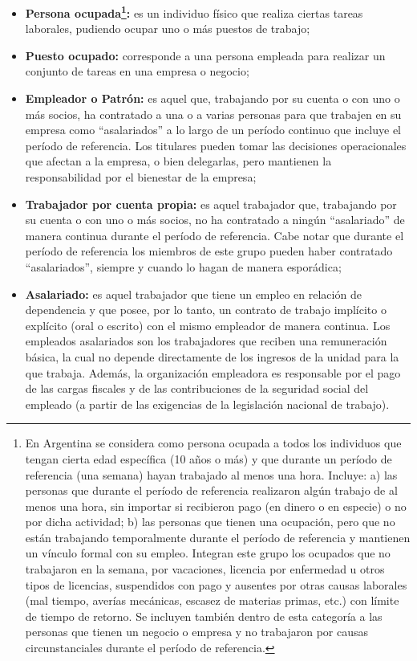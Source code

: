 \documentclass[
  openany]{book}
\providecommand{\tightlist}{%
  \setlength{\itemsep}{0pt}\setlength{\parskip}{0pt}}
\begin{document}
\begin{itemize}
\tightlist
\item
  \textbf{Persona ocupada\footnote{En Argentina se considera como persona ocupada a todos los individuos que tengan cierta edad específica (10 años o más) y que durante un período de referencia (una semana) hayan trabajado al menos una hora. Incluye: a) las personas que durante el período de referencia realizaron algún trabajo de al menos una hora, sin importar si recibieron pago (en dinero o en especie) o no por dicha actividad; b) las personas que tienen una ocupación, pero que no están trabajando temporalmente durante el período de referencia y mantienen un vínculo formal con su empleo. Integran este grupo los ocupados que no trabajaron en la semana, por vacaciones, licencia por enfermedad u otros tipos de licencias, suspendidos con pago y ausentes por otras causas laborales (mal tiempo, averías mecánicas, escasez de materias primas, etc.) con límite de tiempo de retorno. Se incluyen también dentro de esta categoría a las personas que tienen un negocio o empresa y no trabajaron por causas circunstanciales durante el período de referencia.}:} es un individuo físico que realiza ciertas tareas laborales, pudiendo ocupar uno o más puestos de trabajo;
\item
  \textbf{Puesto ocupado:} corresponde a una persona empleada para realizar un conjunto de tareas en una empresa o negocio;
\item
  \textbf{Empleador o Patrón:} es aquel que, trabajando por su cuenta o con uno o más socios, ha contratado a una o a varias personas para que trabajen en su empresa como ``asalariados'' a lo largo de un período continuo que incluye el período de referencia. Los titulares pueden tomar las decisiones operacionales que afectan a la empresa, o bien delegarlas, pero mantienen la responsabilidad por el bienestar de la empresa;
\item
  \textbf{Trabajador por cuenta propia:} es aquel trabajador que, trabajando por su cuenta o con uno o más socios, no ha contratado a ningún ``asalariado'' de manera continua durante el período de referencia. Cabe notar que durante el período de referencia los miembros de este grupo pueden haber contratado ``asalariados'', siempre y cuando lo hagan de manera esporádica;
\item
  \textbf{Asalariado:} es aquel trabajador que tiene un empleo en relación de dependencia y que posee, por lo tanto, un contrato de trabajo implícito o explícito (oral o escrito) con el mismo empleador de manera continua. Los empleados asalariados son los trabajadores que reciben una remuneración básica, la cual no depende directamente de los ingresos de la unidad para la que trabaja. Además, la organización empleadora es responsable por el pago de las cargas fiscales y de las contribuciones de la seguridad social del empleado (a partir de las exigencias de la legislación nacional de trabajo).
\end{itemize}
\end{document}
